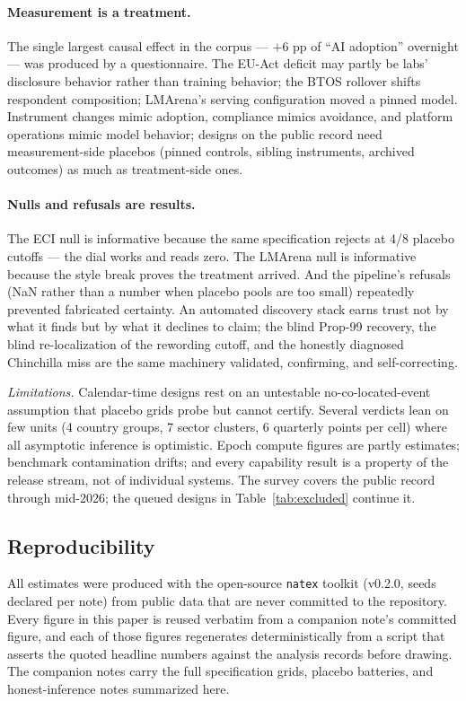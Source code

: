 \documentclass[11pt]{article}
\newcommand{\natex}{\texttt{natex}}
\begin{document}
\paragraph{Measurement is a treatment.} The single largest causal effect in
the corpus --- $+6$ pp of ``AI adoption'' overnight --- was produced by a
questionnaire. The EU-Act deficit may partly be labs' disclosure behavior
rather than training behavior; the BTOS rollover shifts respondent
composition; LMArena's serving configuration moved a pinned model.
Instrument changes mimic adoption, compliance mimics avoidance, and
platform operations mimic model behavior; designs on the public record need
measurement-side placebos (pinned controls, sibling instruments, archived
outcomes) as much as treatment-side ones.

\paragraph{Nulls and refusals are results.} The ECI null is informative
because the same specification rejects at 4/8 placebo cutoffs --- the dial
works and reads zero. The LMArena null is informative because the style
break proves the treatment arrived. And the pipeline's refusals (NaN rather
than a number when placebo pools are too small) repeatedly prevented
fabricated certainty. An automated discovery stack earns trust not by what
it finds but by what it declines to claim; the blind Prop-99 recovery, the
blind re-localization of the rewording cutoff, and the honestly diagnosed
Chinchilla miss are the same machinery validated, confirming, and
self-correcting.

\emph{Limitations.} Calendar-time designs rest on an untestable
no-co-located-event assumption that placebo grids probe but cannot certify.
Several verdicts lean on few units (4 country groups, 7 sector clusters, 6
quarterly points per cell) where all asymptotic inference is optimistic.
Epoch compute figures are partly estimates; benchmark contamination drifts;
and every capability result is a property of the release stream, not of
individual systems. The survey covers the public record through mid-2026;
the queued designs in Table~\ref{tab:excluded} continue it.

\subsection*{Reproducibility}

All estimates were produced with the open-source \natex{} toolkit
\cite{natex} (v0.2.0, seeds declared per note) from public data that are
never committed to the repository. Every figure in this paper is reused
verbatim from a companion note's committed figure, and each of those
figures regenerates deterministically from a script that asserts the
quoted headline numbers against the analysis records before drawing. The
companion notes
\cite{flagship,notereword,noteexport,notebtosr1,notecapex,notelmarena,noteeuact,noteeci,notechinchilla,noteprop99,notesemis}
carry the full specification grids, placebo batteries, and
honest-inference notes summarized here.
\end{document}
